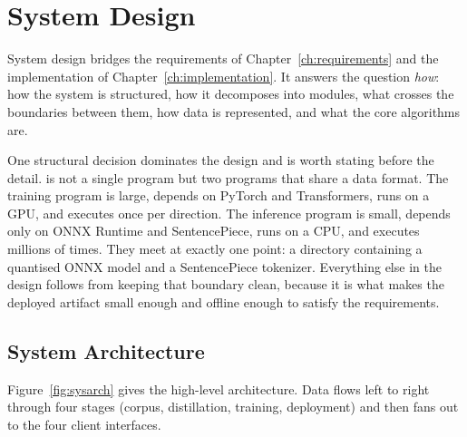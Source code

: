 \chapter{System Design}
\label{ch:design}

System design bridges the requirements of Chapter~\ref{ch:requirements} and the
implementation of Chapter~\ref{ch:implementation}. It answers the question
\emph{how}: how the system is structured, how it decomposes into modules, what
crosses the boundaries between them, how data is represented, and what the core
algorithms are.

One structural decision dominates the design and is worth stating before the
detail. \setu{} is not a single program but two programs that share a data
format. The training program is large, depends on PyTorch and Transformers, runs
on a GPU, and executes once per direction. The inference program is small,
depends only on ONNX Runtime and SentencePiece, runs on a CPU, and executes
millions of times. They meet at exactly one point: a directory containing a
quantised ONNX model and a SentencePiece tokenizer. Everything else in the
design follows from keeping that boundary clean, because it is what makes the
deployed artifact small enough and offline enough to satisfy the requirements.

\section{System Architecture}
\label{sec:architecture}

Figure~\ref{fig:sysarch} gives the high-level architecture. Data flows left to
right through four stages (corpus, distillation, training, deployment) and
then fans out to the four client interfaces.

